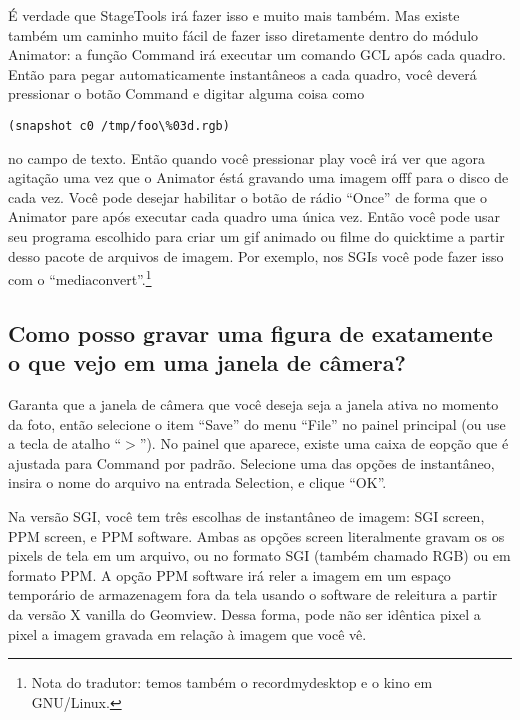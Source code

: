 \documentclass[12pt,a4paper]{article}
\begin{document}
\begin{itemize}
            \'E verdade que StageTools ir\'a fazer isso e muito mais tamb\'em. Mas
            existe tamb\'em um caminho muito f\'acil de fazer isso diretamente dentro do m\'{o}dulo
            Animator: a fun\c{c}\~ao Command ir\'a executar um comando GCL ap\'{o}s
            cada quadro. Ent\~ao para pegar automaticamente instant\^aneos a cada quadro, voc\^e dever\'a
            pressionar o bot\~ao Command e digitar alguma coisa como
\begin{verbatim}
(snapshot c0 /tmp/foo\%03d.rgb)
\end{verbatim}
            no campo de texto. Ent\~ao quando voc\^e pressionar play voc\^e ir\'a ver que agora
            agita\c{c}\~ao uma vez que o Animator \'est\'a gravando uma imagem offf para o disco de cada vez. Voc\^e pode
            desejar habilitar o bot\~ao de r\'adio ``Once'' de forma que o Animator pare ap\'{o}s
            executar cada quadro uma \'unica vez. Ent\~ao voc\^e pode usar seu programa
            escolhido para criar um gif animado ou filme do quicktime a partir desso pacote
            de arquivos de imagem. Por exemplo, nos SGIs voc\^e pode fazer isso com o
            ``mediaconvert''.\footnote{Nota do tradutor: temos tamb\'em o recordmydesktop e o kino em GNU/Linux.}
        \end{itemize}

    \subsection{Como posso gravar uma figura de exatamente o que vejo em uma janela de c\^amera?}

        Garanta que a janela de c\^amera que voc\^e deseja seja a janela ativa no momento da foto, ent\~ao selecione
        o item ``Save'' do menu ``File'' no painel principal (ou use a tecla de atalho
        ``$>$''). No painel que aparece, existe uma caixa de eop\c{c}\~ao que \'e ajustada para
        Command por padr\~ao. Selecione uma das op\c{c}\~oes de instant\^aneo, insira o
        nome do arquivo na entrada Selection, e clique ``OK''.

        Na vers\~ao SGI, voc\^e tem tr\^es escolhas de instant\^aneo de imagem: SGI screen,
        PPM screen, e PPM software. Ambas as op\c{c}\~oes screen literalmente gravam os
        os pixels de tela em um arquivo, ou no formato SGI (tamb\'em chamado RGB) ou em formato PPM. A
        op\c{c}\~ao PPM software ir\'a reler a imagem em um espa\c{c}o tempor\'ario de armazenagem fora da tela
        usando o software de releitura a partir da vers\~ao X vanilla do Geomview.
        Dessa forma, pode n\~ao ser id\^entica pixel a pixel a imagem gravada em rela\c{c}\~ao \`a imagem que voc\^e v\^e.
\end{document}
